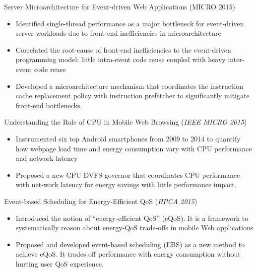 \documentclass[margin, 9pt]{res} %
\begin{document}
\begin{resume}
\medskip
Server Microarchitecture for Event-driven Web Applications \hfill(MICRO 2015)\\
\vspace*{-10pt}
\begin{itemize}[leftmargin=*] \itemsep -3pt
\vspace*{-5pt}
	\item Identified single-thread performance as a major bottleneck for event-driven server workloads due to front-end inefficiencies in microarchitecture
	\item Correlated the root-cause of front-end inefficiencies to the event-driven programming model: little intra-event code reuse coupled with heavy inter-event code reuse
	\item Developed a microarchitecture mechanism that coordinates the instruction cache replacement policy with instruction prefetcher to significantly mitigate front-end bottlenecks.
\end{itemize}

\medskip
Understanding the Role of CPU in Mobile Web Browsing \hfill(\textit{IEEE MICRO 2015})\\
\vspace*{-10pt}
\begin{itemize}[leftmargin=*] \itemsep -3pt
\vspace*{-5pt}
	\item Instrumented six top Android smartphones from 2009 to 2014 to quantify how webpage load time and energy consumption vary with CPU performance and network latency
	\item Proposed a new CPU DVFS governor that coordinates CPU performance with net-work latency for energy savings with little performance impact.
\end{itemize}

\medskip
Event-based Scheduling for Energy-Efficient QoS \hfill(\textit{HPCA 2015})\\
\vspace*{-10pt}
\begin{itemize}[leftmargin=*] \itemsep -3pt
\vspace*{-5pt}
	\item Introduced the notion of ``energy-efficient QoS'' (eQoS). It is a framework to systematically reason about energy-QoS trade-offs in mobile Web applications
	\item Proposed and developed event-based scheduling (EBS) as a new method to achieve eQoS. It trades off performance with energy consumption without hurting user QoS experience.
\end{itemize}


\end{resume}
\end{document}
